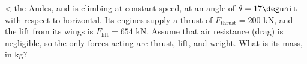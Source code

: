  <%
the Andes, and is climbing at constant speed, at an angle of
$\theta =17\degunit$ with respect to horizontal.  Its engines
supply a thrust of $F_\text{thrust}=200$ kN, and the lift from
its wings is $F_\text{lift}=654$ kN.  Assume that air resistance
(drag) is negligible, so the only forces acting are thrust,
lift, and weight.  What is its mass, in kg?
